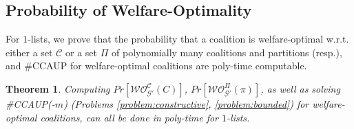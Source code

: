 \documentclass[letterpaper]{article} %
\newtheorem{theorem}{Theorem}
\begin{document}
%
\subsection{Probability of Welfare-Optimality}
\label{sec:Probability of Optimality}
For $1$-lists, we prove that the probability that a coalition is welfare-optimal w.r.t. either a set $\mathcal{C}$ or a set $\Pi$ of polynomially many coalitions and partitions (resp.), %
and \#CCAUP for welfare-optimal coalitions are poly-time computable.
\begin{theorem}
\label{theorem:max-tractable}
Computing $Pr[\mathcal{WO}^{\mathcal{C}}_{\mathcal{G}'}(C)]$, $Pr[\mathcal{WO}_{\mathcal{G}'}^{\Pi}(\pi)]$, as well as solving \#CCAUP(-$m$) (Problems \ref{problem:constructive}, \ref{problem:bounded}) for welfare-optimal coalitions, can all be done in poly-time for $1$-lists.
\end{theorem}
\end{document}
